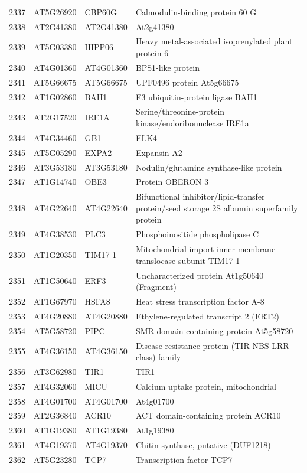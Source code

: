 \documentclass[11pt]{article}
\begin{document}
\begin{center}
\begin{tabular}{rlll}
2337 & AT5G26920 & CBP60G & Calmodulin-binding protein 60 G\\
2338 & AT2G41380 & AT2G41380 & At2g41380\\
2339 & AT5G03380 & HIPP06 & Heavy metal-associated isoprenylated plant protein 6\\
2340 & AT4G01360 & AT4G01360 & BPS1-like protein\\
2341 & AT5G66675 & AT5G66675 & UPF0496 protein At5g66675\\
2342 & AT1G02860 & BAH1 & E3 ubiquitin-protein ligase BAH1\\
2343 & AT2G17520 & IRE1A & Serine/threonine-protein kinase/endoribonuclease IRE1a\\
2344 & AT4G34460 & GB1 & ELK4\\
2345 & AT5G05290 & EXPA2 & Expansin-A2\\
2346 & AT3G53180 & AT3G53180 & Nodulin/glutamine synthase-like protein\\
2347 & AT1G14740 & OBE3 & Protein OBERON 3\\
2348 & AT4G22640 & AT4G22640 & Bifunctional inhibitor/lipid-transfer protein/seed storage 2S albumin superfamily protein\\
2349 & AT4G38530 & PLC3 & Phosphoinositide phospholipase C\\
2350 & AT1G20350 & TIM17-1 & Mitochondrial import inner membrane translocase subunit TIM17-1\\
2351 & AT1G50640 & ERF3 & Uncharacterized protein At1g50640 (Fragment)\\
2352 & AT1G67970 & HSFA8 & Heat stress transcription factor A-8\\
2353 & AT4G20880 & AT4G20880 & Ethylene-regulated transcript 2 (ERT2)\\
2354 & AT5G58720 & PIPC & SMR domain-containing protein At5g58720\\
2355 & AT4G36150 & AT4G36150 & Disease resistance protein (TIR-NBS-LRR class) family\\
2356 & AT3G62980 & TIR1 & TIR1\\
2357 & AT4G32060 & MICU & Calcium uptake protein, mitochondrial\\
2358 & AT4G01700 & AT4G01700 & At4g01700\\
2359 & AT2G36840 & ACR10 & ACT domain-containing protein ACR10\\
2360 & AT1G19380 & AT1G19380 & At1g19380\\
2361 & AT4G19370 & AT4G19370 & Chitin synthase, putative (DUF1218)\\
2362 & AT5G23280 & TCP7 & Transcription factor TCP7\\

\end{tabular}
\end{center}
\end{document}
